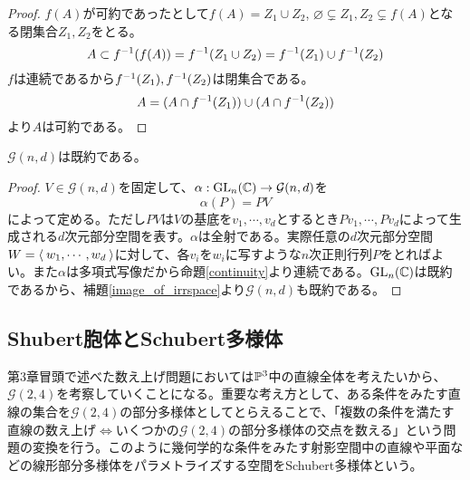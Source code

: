 \documentclass{ltjsreport}
\begin{document}
\begin{proof}
  $f(A)$が可約であったとして$f(A)=Z_1\cup Z_2$, $\varnothing\subsetneq Z_1,Z_2\subsetneq f(A)$となる閉集合$Z_1,Z_2$をとる。
  \[
  A\subset f^{-1}(f(A))=f^{-1}(Z_1\cup Z_2)=f^{-1}(Z_1)\cup f^{-1}(Z_2)  
  \]
  $f$は連続であるから$f^{-1}(Z_1), f^{-1}(Z_2)$は閉集合である。
  \[
  A=(A\cap f^{-1}(Z_1))\cup(A\cap f^{-1}(Z_2))
  \]
  より$A$は可約である。
\end{proof}

\begin{prop}
  $\mathcal{G}(n,d)$は既約である。
\end{prop}

\begin{proof}
  $V\in\mathcal{G}(n,d)$を固定して、$\alpha:\text{GL}_n(\mathbb{C})\rightarrow\mathcal{G}(n,d)$を
  \[
  \alpha(P)=PV  
  \]
  によって定める。ただし$PV$は$V$の基底を$v_1,\cdots,v_d$とするとき$Pv_1,\cdots,Pv_d$によって生成される$d$次元部分空間を表す。$\alpha$は全射である。実際任意の$d$次元部分空間$W=\langle\:w_1,\cdots,w_d\:\rangle$に対して、各$v_i$を$w_i$に写すような$n$次正則行列$P$をとればよい。また$\alpha$は多項式写像だから命題\ref{continuity}より連続である。$\text{GL}_n(\mathbb{C})$は既約であるから、補題\ref{image_of_irrspace}より$\mathcal{G}(n,d)$も既約である。
\end{proof}






\subsection{Shubert胞体とSchubert多様体}

第3章冒頭で述べた数え上げ問題においては$\mathbb{P}^3$中の直線全体を考えたいから、$\mathcal{G}(2,4)$を考察していくことになる。重要な考え方として、ある条件をみたす直線の集合を$\mathcal{G}(2,4)$の部分多様体としてとらえることで、「複数の条件を満たす直線の数え上げ$\Leftrightarrow$いくつかの$\mathcal{G}(2,4)$の部分多様体の交点を数える」という問題の変換を行う。このように幾何学的な条件をみたす射影空間中の直線や平面などの線形部分多様体をパラメトライズする空間をSchubert多様体という。
\end{document}
